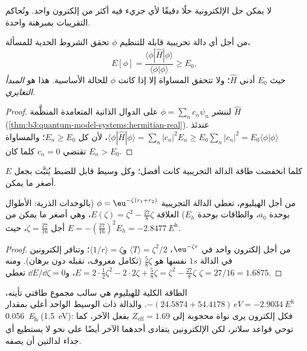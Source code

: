 لا يمكن حل  الإلكترونية حلًا دقيقًا لأي
جزيء فيه أكثر من إلكترون واحد. وتُحاكم التقريبات بمبرهنة
واحدة.

\begin{theorem}\label{thm:b3:computational-chemistry:variational}
من أجل أي دالة تجريبية قابلة للتنظيم $\phi$ تحقق الشروط
الحدية للمسألة،
\[
E[\phi] = \frac{\langle\phi|\hat H|\phi\rangle}{\langle\phi|\phi\rangle} \ge E_0,
\]
حيث $E_0$ أدنى   $\hat H$؛ ولا تتحقق المساواة إلا إذا كانت $\phi$
 للحالة الأساسية. هذا هو \emph{المبدأ
التغايري}.
\end{theorem}

\begin{proof}
لننشر $\phi = \sum_nc_n\psi_n$ على الدوال الذاتية المتعامدة المنظَّمة  $\hat H$
(\cref{thm:b3:quantum-model-systems:hermitian-real}). عندئذ $\langle\phi|\hat
H|\phi\rangle = \sum_n|c_n|^2E_n \ge E_0\sum_n|c_n|^2 = E_0\langle\phi|\phi\rangle$،
لأن كل $E_n \ge E_0$؛ والمساواة تقتضي $c_n = 0$ كلما كان $E_n > E_0$.
\end{proof}

كلما انخفضت طاقة الدالة التجريبية كانت أفضل؛ وكل وسيط قابل
للضبط يُثبَّت بجعل $E$ أصغر ما يمكن.

\begin{proposition}\label{prop:b3:computational-chemistry:helium-zeta}
من أجل الهيليوم، تعطي الدالة التجريبية $\phi = \eu^{-\zeta(r_1 + r_2)}$ (بالوحدات الذرية:
الأطوال بوحدة $a_0$، والطاقات بوحدة $E_h$) العلاقة $E(\zeta) = \zeta^2 - \frac{27}{8}\zeta$،
وهي أصغر ما يمكن من أجل $\zeta = \frac{27}{16}$، حيث $E = -(\frac{27}{16})^2 E_h =
\qty{-2.8477}{\hartree}$.
\end{proposition}

\begin{proof}
من أجل إلكترون واحد في $\eu^{-\zeta r}$، $\langle T\rangle = \zeta^2/2$ 
و$\langle 1/r\rangle = \zeta$؛ وتنافر إلكترونين في الدالة $1s$ نفسها
هو $\frac58\zeta$ (تكامل معروف، نقبله دون برهان). ومنه $E = 2\cdot\frac12
\zeta^2 - 2\cdot2\zeta + \frac58\zeta = \zeta^2 - \frac{27}{8}\zeta$، و$\dd E/\dd
\zeta = 0$ تعطي $\zeta = 27/16 = 1.6875$.
\end{proof}

\begin{example}\label{ex:b3:computational-chemistry:helium}
الطاقة الكلية للهيليوم هي سالب مجموع طاقتي تأينه،
$-(24.5874 + 54.4178)\,\unit{eV} = \qty{-2.9034}{\hartree}$. والدالة ذات
الوسيط الواحد أعلى بمقدار \qty{0.056}{\hartree} (\qty{1.5}{eV}): فكل إلكترون يرى
نواة محجوبة إلى $Z_{\mathrm{eff}} = 1.69$ بفعل الآخر، كما توحي
قواعد سلاتر، لكن الإلكترونين يتفادى أحدهما الآخر أيضًا على نحو لا يستطيع أي جداء
لدالتين أن يصفه.
\end{example}

